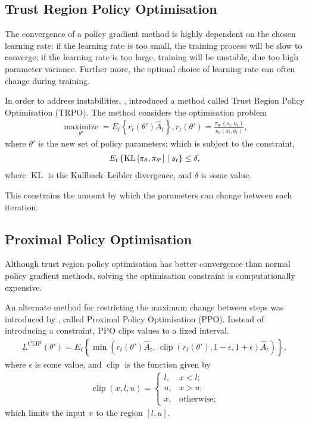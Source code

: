 \subsection{Trust Region Policy Optimisation}

The convergence of a policy gradient method is highly dependent on the chosen
learning rate:
if the learning rate is too small, the training process will be slow to
converge;
if the learning rate is too large, training will be unstable, due too high
parameter variance.
Further more, the optimal choice of learning rate can often change during
training.

In order to address instabilities, \cite{Schulman:2015:Trust}, introduced a
method called Trust Region Policy Optimisation (TRPO).
The method considers the optimisation problem
\begin{align*}
    \underset{\theta'}{\operatorname{maximize}} = E_t\left\{
        r_t(\theta')\hat{A}_t
    \right\},
    r_t(\theta') = \frac{\pi_{\theta'}(s_t,a_t)}{\pi_{\theta}(s_t,a_t)},
\end{align*}
where $\theta'$ is the new set of policy parameters; which is subject to the
constraint,
\begin{align*}
    E_t\left\{ \operatorname{KL}\left[\pi_{\theta},\pi_{\theta'}\right]
        \;\middle|\; s_t
    \right\} \leq \delta,
\end{align*}
where $\operatorname{KL}$ is the Kullback–Leibler divergence, and $\delta$ is
some value.

This constrains the amount by which the parameters can change between each
iteration.



\subsection{Proximal Policy Optimisation}

Although trust region policy optimisation has better convergence than normal
policy gradient methods, solving the optimisation constraint is computationally
expensive.

An alternate method for restricting the maximum change between steps was
introduced by \cite{Schulman:2017:Proximal}, called Proximal Policy
Optimisation (PPO).
Instead of introducing a constraint, PPO clips values to a fixed interval.
\begin{align*}
    L^\text{CLIP}(\theta') = E_t\left\{ \min\left(
        r_t(\theta')\hat{A}_t,\,
        \operatorname{clip} (r_t(\theta'), 1 - \epsilon, 1 + \epsilon)\hat{A}_t
    \right) \right\},
\end{align*}
where $\epsilon$ is some value, and $\operatorname{clip}$ is the function given
by
\begin{align*}
    \operatorname{clip}(x,l,u) = \begin{cases}
        l, & x < l;\\
        u, & x > u;\\
        x, & \text{otherwise};
    \end{cases}
\end{align*}
which limits the input $x$ to the region $[l,u]$.



